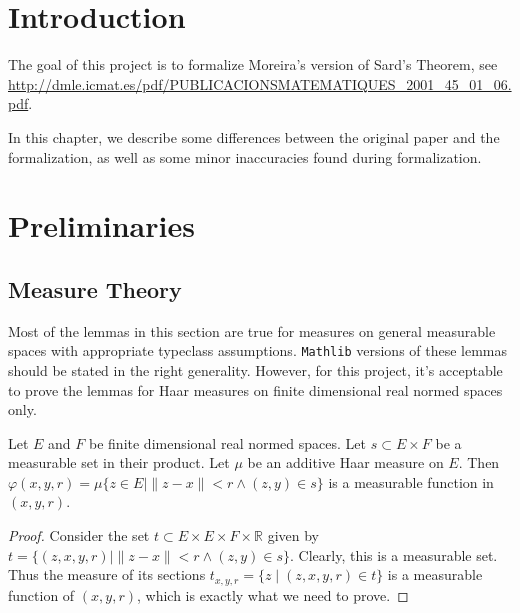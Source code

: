 %

\chapter{Introduction}%
\label{cha:introduction}

The goal of this project is to formalize Moreira's version of Sard's Theorem,
see \url{http://dmle.icmat.es/pdf/PUBLICACIONSMATEMATIQUES_2001_45_01_06.pdf}.

In this chapter, we describe some differences
between the original paper and the formalization,
as well as some minor inaccuracies found during formalization.

\chapter{Preliminaries}%
\label{cha:preliminaries}

\section{Measure Theory}%
\label{sec:measure-theory}

Most of the lemmas in this section
are true for measures on general measurable spaces
with appropriate typeclass assumptions.
\texttt{Mathlib} versions of these lemmas should be stated
in the right generality.
However, for this project, it's acceptable to prove the lemmas
for Haar measures on finite dimensional real normed spaces only.

\begin{lemma}%
  \label{lem:measurable-meas-ball}
  \leanok%
  Let \(E\) and \(F\) be finite dimensional real normed spaces.
  Let \(s \subset E \times F\) be a measurable set in their product.
  Let \(\mu\) be an additive Haar measure on \(E\).
  Then \(\varphi(x, y, r) = \mu \{z \in E\mid \|z - x\| < r \wedge (z, y) \in s\}\)
  is a measurable function in \((x, y, r)\).
\end{lemma}
\begin{proof}
  \leanok%
  Consider the set \(t \subset E \times E \times F \times \mathbb R\)
  given by \(t = \{(z, x, y, r) \mid \|z - x\| < r \wedge (z, y) \in s\}\).
  Clearly, this is a measurable set.
  Thus the measure of its sections \(t_{x, y, r}=\{z \mid (z, x, y, r) \in t\}\)
  is a measurable function of \((x, y, r)\),
  which is exactly what we need to prove.
\end{proof}

